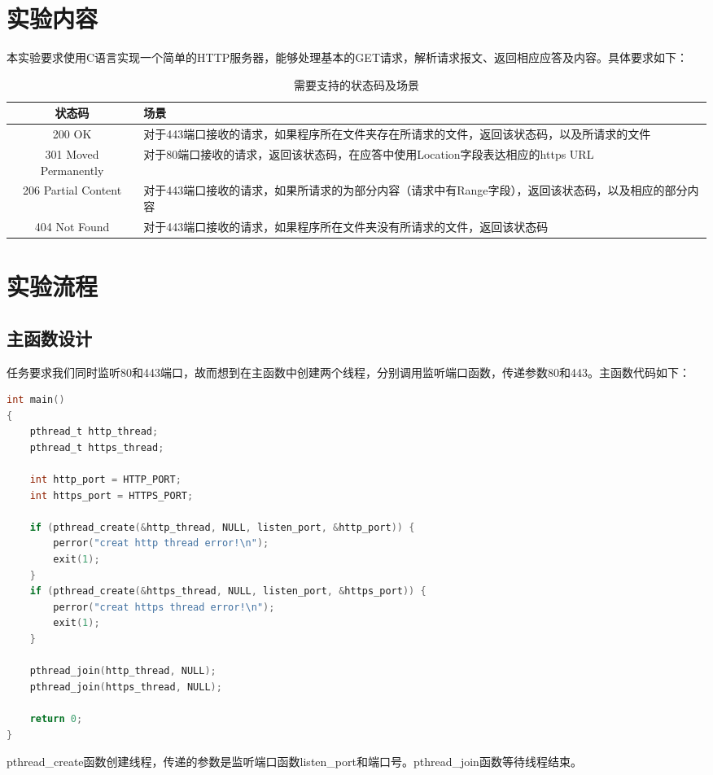 \documentclass[11pt]{article}
\begin{document}


\section{实验内容}
本实验要求使用C语言实现一个简单的HTTP服务器，能够处理基本的GET请求，解析请求报文、返回相应应答及内容。具体要求如下：

\begin{table}[H]
\centering
\caption{需要支持的状态码及场景}
\begin{tabular}{|c|p{10cm}|}
\hline
\textbf{状态码} & \textbf{场景} \\ \hline
200 OK & 对于443端口接收的请求，如果程序所在文件夹存在所请求的文件，返回该状态码，以及所请求的文件 \\ \hline
301 Moved Permanently & 对于80端口接收的请求，返回该状态码，在应答中使用Location字段表达相应的https URL \\ \hline
206 Partial Content & 对于443端口接收的请求，如果所请求的为部分内容（请求中有Range字段），返回该状态码，以及相应的部分内容 \\ \hline
404 Not Found & 对于443端口接收的请求，如果程序所在文件夹没有所请求的文件，返回该状态码 \\ \hline
\end{tabular}
\end{table}

\section{实验流程}
\subsection{主函数设计}
任务要求我们同时监听80和443端口，故而想到在主函数中创建两个线程，分别调用监听端口函数，传递参数80和443。主函数代码如下：
\begin{lstlisting}[language=C]
int main()
{
    pthread_t http_thread;
    pthread_t https_thread;

    int http_port = HTTP_PORT;
    int https_port = HTTPS_PORT;

    if (pthread_create(&http_thread, NULL, listen_port, &http_port)) {
        perror("creat http thread error!\n");
        exit(1);
    }
    if (pthread_create(&https_thread, NULL, listen_port, &https_port)) {
        perror("creat https thread error!\n");
        exit(1);
    }

    pthread_join(http_thread, NULL);
    pthread_join(https_thread, NULL);

    return 0;
}
\end{lstlisting}
pthread\_create函数创建线程，传递的参数是监听端口函数listen\_port和端口号。pthread\_join函数等待线程结束。
\end{document}
